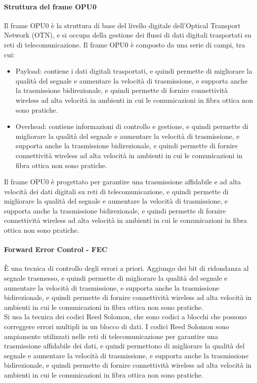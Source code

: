 \paragraph{Struttura del frame OPU0}
Il frame OPU0 è la struttura di base del livello digitale dell'Optical Transport Network (OTN), e si occupa della gestione dei flussi di dati digitali trasportati su reti di telecomunicazione. Il frame OPU0 è composto da una serie di campi, tra cui:
\begin{itemize}
    \item Payload: contiene i dati digitali trasportati, e quindi permette di migliorare la qualità del segnale e aumentare la velocità di trasmissione, e supporta anche la trasmissione bidirezionale, e quindi permette di fornire connettività wireless ad alta velocità in ambienti in cui le comunicazioni in fibra ottica non sono pratiche.\\
    \item Overhead: contiene informazioni di controllo e gestione, e quindi permette di migliorare la qualità del segnale e aumentare la velocità di trasmissione, e supporta anche la trasmissione bidirezionale, e quindi permette di fornire connettività wireless ad alta velocità in ambienti in cui le comunicazioni in fibra ottica non sono pratiche.\\
\end{itemize}

Il frame OPU0 è progettato per garantire una trasmissione affidabile e ad alta velocità dei dati digitali su reti di telecomunicazione, e quindi permette di migliorare la qualità del segnale e aumentare la velocità di trasmissione, e supporta anche la trasmissione bidirezionale, e quindi permette di fornire connettività wireless ad alta velocità in ambienti in cui le comunicazioni in fibra ottica non sono pratiche.\\

\paragraph{Forward Error Control - FEC}
È una tecnica di controllo degli errori a priori. Aggiungo dei bit di ridondanza al segnale trasmesso, e quindi permette di migliorare la qualità del segnale e aumentare la velocità di trasmissione, e supporta anche la trasmissione bidirezionale, e quindi permette di fornire connettività wireless ad alta velocità in ambienti in cui le comunicazioni in fibra ottica non sono pratiche.\\
Si usa la tecnica dei codici Reed Solomon, che sono codici a blocchi che possono correggere errori multipli in un blocco di dati. I codici Reed Solomon sono ampiamente utilizzati nelle reti di telecomunicazione per garantire una trasmissione affidabile dei dati, e quindi permettono di migliorare la qualità del segnale e aumentare la velocità di trasmissione, e supporta anche la trasmissione bidirezionale, e quindi permette di fornire connettività wireless ad alta velocità in ambienti in cui le comunicazioni in fibra ottica non sono pratiche.\\   


